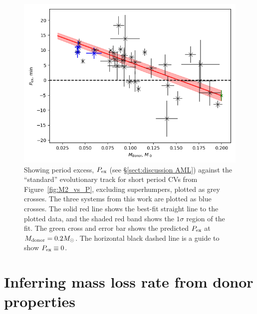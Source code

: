 \begin{figure}
    \centering
    \includegraphics[width=\columnwidth]{figures/results/three_cvs_with_weird_colours/GeneralFigs/p_excess_line_fit.png}
    \caption{Showing period excess, $P_{\rm ex}$ (see \S\ref{sect:discussion AML}) against the \citet{knigge11} ``standard'' evolutionary track for short period CVs from Figure~\ref{fig:M2_vs_P}, excluding superhumpers, plotted as grey crosses. The three systems from this work are plotted as blue crosses. The solid red line shows the best-fit straight line to the plotted data, and the shaded red band shows the $1\sigma$ region of the fit. The green cross and error bar shows the predicted $P_{\rm ex}$ at $M_{\rm donor} = 0.2 M_\odot$. The horizontal black dashed line is a guide to show $P_{\rm ex} \equiv 0$.}
    \label{fig:period excess}
\end{figure}


\section{Inferring mass loss rate from donor properties}



